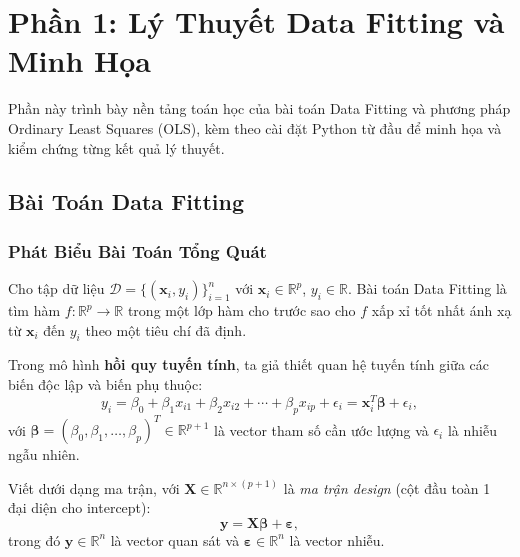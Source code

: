 \section{Phần 1: Lý Thuyết Data Fitting và Minh Họa}

Phần này trình bày nền tảng toán học của bài toán Data Fitting và phương pháp
Ordinary Least Squares (OLS), kèm theo cài đặt Python từ đầu để minh họa và
kiểm chứng từng kết quả lý thuyết.

\subsection{Bài Toán Data Fitting}

\subsubsection{Phát Biểu Bài Toán Tổng Quát}

\begin{tcolorbox}[mycodebox, colback=blue!3!white, colframe=blue!40!black,
    title={\textbf{Định nghĩa 1.1} - Bài Toán Data Fitting}]
Cho tập dữ liệu $\mathcal{D} = \{(\mathbf{x}_i, y_i)\}_{i=1}^n$ với
$\mathbf{x}_i \in \mathbb{R}^p$, $y_i \in \mathbb{R}$.
Bài toán Data Fitting là tìm hàm $f : \mathbb{R}^p \to \mathbb{R}$ trong một
lớp hàm cho trước sao cho $f$ xấp xỉ tốt nhất ánh xạ từ $\mathbf{x}_i$ đến
$y_i$ theo một tiêu chí đã định.
\end{tcolorbox}

Trong mô hình \textbf{hồi quy tuyến tính}, ta giả thiết quan hệ tuyến tính
giữa các biến độc lập và biến phụ thuộc:
\begin{equation}
    y_i = \beta_0 + \beta_1 x_{i1} + \beta_2 x_{i2} + \cdots + \beta_p x_{ip}
          + \epsilon_i
        = \mathbf{x}_i^T \boldsymbol{\beta} + \epsilon_i,
    \label{eq:linear_model}
\end{equation}
với $\boldsymbol{\beta} = (\beta_0, \beta_1, \ldots, \beta_p)^T \in \mathbb{R}^{p+1}$
là vector tham số cần ước lượng và $\epsilon_i$ là nhiễu ngẫu nhiên.

Viết dưới dạng ma trận, với
$\mathbf{X} \in \mathbb{R}^{n \times (p+1)}$ là \emph{ma trận design} (cột đầu
toàn 1 đại diện cho intercept):
\begin{equation}
    \mathbf{y} = \mathbf{X}\boldsymbol{\beta} + \boldsymbol{\varepsilon},
    \label{eq:matrix_form}
\end{equation}
trong đó $\mathbf{y} \in \mathbb{R}^n$ là vector quan sát và
$\boldsymbol{\varepsilon} \in \mathbb{R}^n$ là vector nhiễu.

